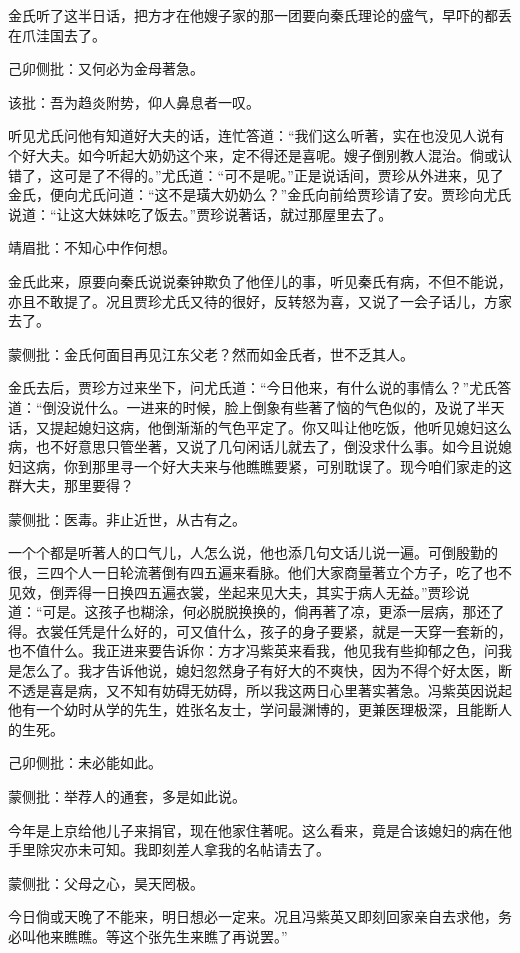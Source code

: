 \begin{parag}
    金氏听了这半日话，把方才在他嫂子家的那一团要向秦氏理论的盛气，早吓的都丢在爪洼国去了。\begin{note}己卯侧批：又何必为金母著急。\end{note}\begin{note}该批：吾为趋炎附势，仰人鼻息者一叹。\end{note}听见尤氏问他有知道好大夫的话，连忙答道：“我们这么听著，实在也没见人说有个好大夫。如今听起大奶奶这个来，定不得还是喜呢。嫂子倒别教人混治。倘或认错了，这可是了不得的。”尤氏道：“可不是呢。”正是说话间，贾珍从外进来，见了金氏，便向尤氏问道：“这不是璜大奶奶么？”金氏向前给贾珍请了安。贾珍向尤氏说道：“让这大妹妹吃了饭去。”贾珍说著话，就过那屋里去了。\begin{note}靖眉批：不知心中作何想。\end{note}金氏此来，原要向秦氏说说秦钟欺负了他侄儿的事，听见秦氏有病，不但不能说，亦且不敢提了。况且贾珍尤氏又待的很好，反转怒为喜，又说了一会子话儿，方家去了。\begin{note}蒙侧批：金氏何面目再见江东父老？然而如金氏者，世不乏其人。\end{note}
\end{parag}


\begin{parag}
    金氏去后，贾珍方过来坐下，问尤氏道：“今日他来，有什么说的事情么？”尤氏答道：“倒没说什么。一进来的时候，脸上倒象有些著了恼的气色似的，及说了半天话，又提起媳妇这病，他倒渐渐的气色平定了。你又叫让他吃饭，他听见媳妇这么病，也不好意思只管坐著，又说了几句闲话儿就去了，倒没求什么事。如今且说媳妇这病，你到那里寻一个好大夫来与他瞧瞧要紧，可别耽误了。现今咱们家走的这群大夫，那里要得？\begin{note}蒙侧批：医毒。非止近世，从古有之。\end{note}一个个都是听著人的口气儿，人怎么说，他也添几句文话儿说一遍。可倒殷勤的很，三四个人一日轮流著倒有四五遍来看脉。他们大家商量著立个方子，吃了也不见效，倒弄得一日换四五遍衣裳，坐起来见大夫，其实于病人无益。”贾珍说道：“可是。这孩子也糊涂，何必脱脱换换的，倘再著了凉，更添一层病，那还了得。衣裳任凭是什么好的，可又值什么，孩子的身子要紧，就是一天穿一套新的，也不值什么。我正进来要告诉你：方才冯紫英来看我，他见我有些抑郁之色，问我是怎么了。我才告诉他说，媳妇忽然身子有好大的不爽快，因为不得个好太医，断不透是喜是病，又不知有妨碍无妨碍，所以我这两日心里著实著急。冯紫英因说起他有一个幼时从学的先生，姓张名友士，学问最渊博的，更兼医理极深，且能断人的生死。\begin{note}己卯侧批：未必能如此。\end{note}\begin{note}蒙侧批：举荐人的通套，多是如此说。\end{note}今年是上京给他儿子来捐官，现在他家住著呢。这么看来，竟是合该媳妇的病在他手里除灾亦未可知。我即刻差人拿我的名帖请去了。\begin{note}蒙侧批：父母之心，昊天罔极。\end{note}今日倘或天晚了不能来，明日想必一定来。况且冯紫英又即刻回家亲自去求他，务必叫他来瞧瞧。等这个张先生来瞧了再说罢。”
\end{parag}


